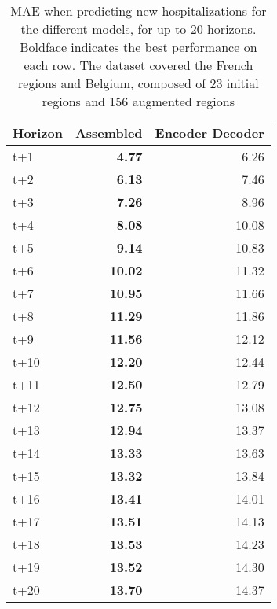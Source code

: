 \begin{table}[H]
\centering
\caption{MAE when predicting new hospitalizations for the different models, for up to 20 horizons. Boldface indicates the best performance on each row. The dataset covered the French regions and Belgium, composed of 23 initial regions and 156 augmented regions }
\label{tab:MAE_comparison}
\begin{tabular}{lrr}
\toprule
Horizon &  Assembled &  Encoder Decoder \\
\midrule
t+1  & \textbf{4.77}  & 6.26  \\
t+2  & \textbf{6.13}  & 7.46  \\
t+3  & \textbf{7.26}  & 8.96  \\
t+4  & \textbf{8.08}  & 10.08  \\
t+5  & \textbf{9.14}  & 10.83  \\
t+6  & \textbf{10.02}  & 11.32  \\
t+7  & \textbf{10.95}  & 11.66  \\
t+8  & \textbf{11.29}  & 11.86  \\
t+9  & \textbf{11.56}  & 12.12  \\
t+10  & \textbf{12.20}  & 12.44  \\
t+11  & \textbf{12.50}  & 12.79  \\
t+12  & \textbf{12.75}  & 13.08  \\
t+13  & \textbf{12.94}  & 13.37  \\
t+14  & \textbf{13.33}  & 13.63  \\
t+15  & \textbf{13.32}  & 13.84  \\
t+16  & \textbf{13.41}  & 14.01  \\
t+17  & \textbf{13.51}  & 14.13  \\
t+18  & \textbf{13.53}  & 14.23  \\
t+19  & \textbf{13.52}  & 14.30  \\
t+20  & \textbf{13.70}  & 14.37  \\

\bottomrule
\end{tabular}
\end{table}
